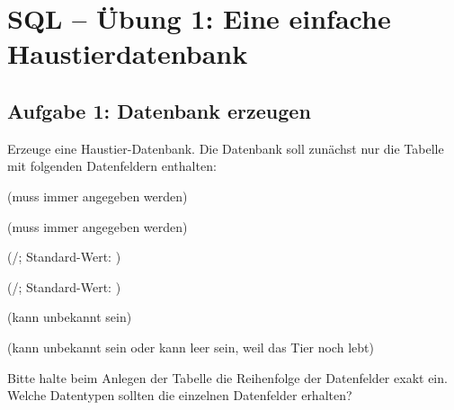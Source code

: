 \clearpage

\rehead[]{\textcolor{lightblue}{AvHG, Inf, My}}
\lohead[]{\textcolor{lightblue}{AvHG, Inf, My}}

\section{SQL -- Übung 1: Eine einfache Haustierdatenbank}

\subsection{Aufgabe 1: Datenbank erzeugen}

Erzeuge eine Haustier-Datenbank. Die Datenbank soll zunächst nur die Tabelle
 mit folgenden Datenfeldern enthalten:

\begin{compactitem}
  \item {} (muss immer angegeben werden)
  \item {} (muss immer angegeben werden)
  \item {} (/;
  Standard-Wert: )
  \item {}
  (/; Standard-Wert:
  )
  \item {} (kann unbekannt sein)
  \item {} (kann unbekannt sein oder kann leer sein, weil
  das Tier noch lebt)
\end{compactitem}

Bitte halte beim Anlegen der Tabelle die Reihenfolge der Datenfelder exakt ein.
Welche Datentypen sollten die einzelnen Datenfelder erhalten?


